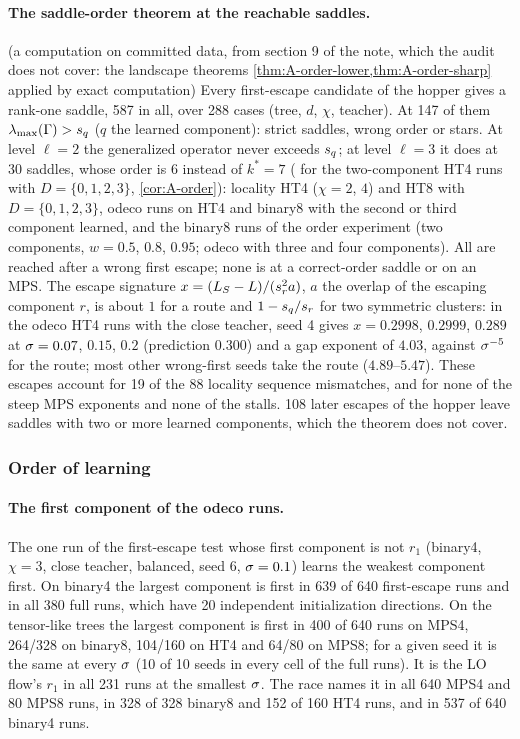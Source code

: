 \paragraph{The saddle-order theorem at the reachable saddles.}
\empirical{} (a computation on committed data, from section 9 of the note, which the audit does not cover: the
landscape theorems \cref{thm:A-order-lower,thm:A-order-sharp} applied by exact computation) Every first-escape
candidate of the hopper gives a rank-one saddle, 587 in all, over 288 cases (tree, $d$, $\chi$, teacher). At 147 of
them $\lambda_{\max}(\Gamma)>s_{q}$ ($q$ the learned component): strict saddles, wrong order or stars. At level
$\ell=2$ the generalized operator never exceeds $s_{q}$; at level $\ell=3$ it does at 30 saddles, whose order is $6$
instead of $k^*=7$ (\proven{} for the two-component HT4 runs with $D=\{0,1,2,3\}$, \cref{cor:A-order}): locality HT4 ($\chi=2$, $4$) and HT8 with $D=\{0,1,2,3\}$, odeco runs on HT4 and binary8 with the
second or third component learned, and the binary8 runs of the order experiment (two components, $w=0.5$, $0.8$,
$0.95$; odeco with three and four components). All are reached after a wrong first escape; none is at a correct-order
saddle or on an MPS. \empirical{} The escape signature $x=(L_S-L)/(s_{r}^2a)$, $a$ the overlap of the escaping
component $r$, is about $1$ for a route and $1-s_{q}/s_{r}$ for two symmetric clusters: in the odeco HT4 runs with the
close teacher, seed 4 gives $x=0.2998$, $0.2999$, $0.289$ at $\sigma=0.07$, $0.15$, $0.2$ (prediction $0.300$) and a gap
exponent of $4.03$, against $\sigma^{-5}$ for the route; most other wrong-first seeds take the route ($4.89$--$5.47$). These
escapes account for 19 of the 88 locality sequence mismatches, and for none of the steep MPS exponents and none of the
stalls. 108 later escapes of the hopper leave saddles with two or more learned components, which the theorem does not
cover.

\subsubsection{Order of learning}\label{app:supp-s2s-order}

\paragraph{The first component of the odeco runs.}
\empirical{} The one run of the first-escape test whose first component is not $r_1$ (binary4, $\chi=3$, close
teacher, balanced, seed 6, $\sigma=0.1$) learns the weakest component first. On binary4 the largest component is
first in 639 of 640 first-escape runs and in all 380 full runs, which have 20 independent initialization
directions. On the tensor-like trees the largest component is first in 400 of 640 runs on MPS4, 264/328 on binary8,
104/160 on HT4 and 64/80 on MPS8; for a given seed it is the same at every $\sigma$ (10 of 10 seeds in every cell of
the full runs). It is the LO flow's $r_1$ in all 231 runs at the smallest $\sigma$. The race names it in all 640 MPS4
and 80 MPS8 runs, in 328 of 328 binary8 and 152 of 160 HT4 runs, and in 537 of 640 binary4 runs.

